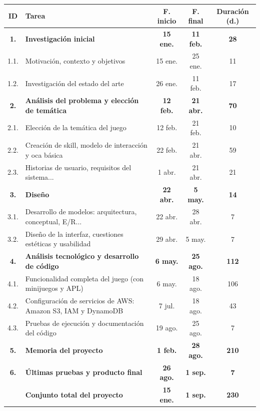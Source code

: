 \begin{tabular}{|c|p{8cm}|c|c|c|}
	\hline
	\rowcolor{lightgray}
	\textbf{ID} & \textbf{Tarea} & \textbf{F. inicio} & \textbf{F. final} & \textbf{Duración (d.)} \\
	\hline
	\textbf{1.} & \textbf{Investigación inicial} & \textbf{15 ene.} & \textbf{11 feb.} & \textbf{28} \\
	\hline
	1.1. & Motivación, contexto y objetivos  & 15 ene. & 25 ene. & 11 \\
	\hline
	1.2. & Investigación del estado del arte & 26 ene. & 11 feb. & 17 \\
	\hline
	\textbf{2.} & \textbf{Análisis del problema y elección de temática} & \textbf{12 feb.} & \textbf{21 abr.} & \textbf{70} \\
	\hline
	2.1. & Elección de la temática del juego & 12 feb. & 21 feb. & 10 \\
	\hline
	2.2. & Creación de skill, modelo de interacción y oca básica & 22 feb. & 21 abr. & 59 \\
	\hline
	2.3. & Historias de usuario, requisitos del sistema... & 1 abr. & 21 abr. & 21 \\
	\hline
	\textbf{3.} & \textbf{Diseño} & \textbf{22 abr.} & \textbf{5 may.} & \textbf{14} \\
	\hline
	3.1. & Desarrollo de modelos: arquitectura, conceptual, E/R...  & 22 abr. & 28 abr. & 7 \\
	\hline
	3.2. & Diseño de la interfaz, cuestiones estéticas y usabilidad & 29 abr. & 5 may. & 7 \\
	\hline
	\textbf{4.} & \textbf{Análisis tecnológico y desarrollo de código} & \textbf{6 may.} & \textbf{25 ago.} & \textbf{112} \\
	\hline
	4.1. & Funcionalidad completa del juego (con minijuegos y APL) & 6 may. & 18 ago. & 106 \\
	\hline
	4.2. & Configuración de servicios de AWS: Amazon S3, IAM y DynamoDB  & 7 jul. & 18 ago. & 43 \\
	\hline
	4.3. & Pruebas de ejecución y documentación del código & 19 ago. & 25 ago. & 7 \\
	\hline
	\textbf{5.} & \textbf{Memoria del proyecto} & \textbf{1 feb.} & \textbf{28 ago.} & \textbf{210} \\
	\hline
	\textbf{6.} & \textbf{Últimas pruebas y producto final} & \textbf{26 ago.} & \textbf{1 sep.} & \textbf{7} \\
	\hline
	\rowcolor{lightgray}
	\textbf{} & \textbf{Conjunto total del proyecto} & \textbf{15 ene.} & \textbf{1 sep.} & \textbf{230} \\
	\hline
\end{tabular}


